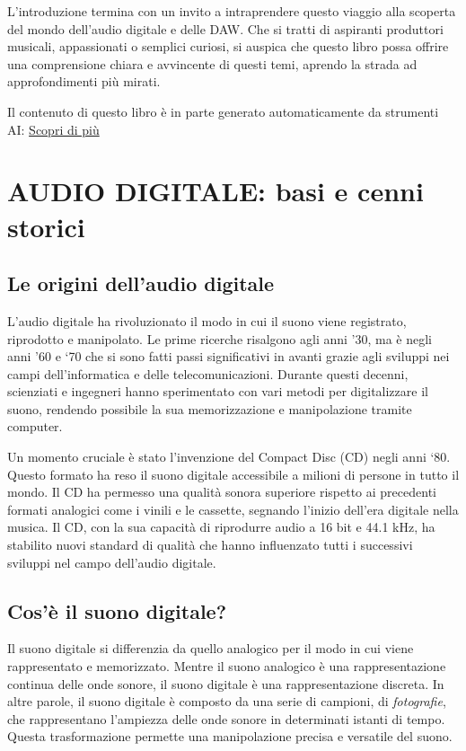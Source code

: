 \documentclass{book}
\begin{document}
L’introduzione termina con un invito a intraprendere questo viaggio alla scoperta del mondo dell’audio digitale e delle DAW. Che si tratti di aspiranti produttori musicali, appassionati o semplici curiosi, si auspica che questo libro possa offrire una comprensione chiara e avvincente di questi temi, aprendo la strada ad approfondimenti più mirati.  

Il contenuto di questo libro è in parte generato automaticamente da strumenti AI: \href{https://www.treccani.it/enciclopedia/intelligenza-artificiale/}{Scopri di più}

\newpage

\chapter{AUDIO DIGITALE: basi e cenni storici}

\section{Le origini dell’audio digitale}

L’audio digitale ha rivoluzionato il modo in cui il suono viene registrato, riprodotto e manipolato. Le prime ricerche risalgono agli anni ’30, ma è negli anni ’60 e ‘70 che si sono fatti passi significativi in avanti grazie agli sviluppi nei campi dell’informatica e delle telecomunicazioni. Durante questi decenni, scienziati e ingegneri hanno sperimentato con vari metodi per digitalizzare il suono, rendendo possibile la sua memorizzazione e manipolazione tramite computer.

Un momento cruciale è stato l’invenzione del Compact Disc (CD) negli anni ‘80. Questo formato ha reso il suono digitale accessibile a milioni di persone in tutto il mondo. Il CD ha permesso una qualità sonora superiore rispetto ai precedenti formati analogici come i vinili e le cassette, segnando l’inizio dell’era digitale nella musica. Il CD, con la sua capacità di riprodurre audio a 16 bit e 44.1 kHz, ha stabilito nuovi standard di qualità che hanno influenzato tutti i successivi sviluppi nel campo dell’audio digitale.

\section{Cos’è il suono digitale?}

Il suono digitale si differenzia da quello analogico per il modo in cui viene rappresentato e memorizzato. Mentre il suono analogico è una rappresentazione continua delle onde sonore, il suono digitale è una rappresentazione discreta. In altre parole, il suono digitale è composto da una serie di campioni, di \emph{fotografie}, che rappresentano l’ampiezza delle onde sonore in determinati istanti di tempo. Questa trasformazione permette una manipolazione precisa e versatile del suono.
\end{document}
